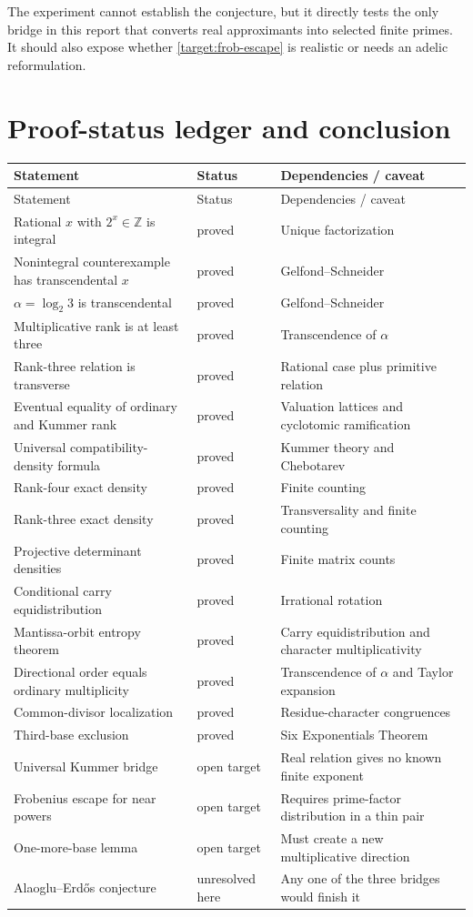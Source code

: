 \documentclass[11pt,oneside]{article}
\theoremstyle{definition}
\theoremstyle{remark}
\newcommand{\Z}{\mathbb{Z}}
\begin{document}
The experiment cannot establish the conjecture, but it directly tests the
only bridge in this report that converts real approximants into selected
finite primes.  It should also expose whether
\cref{target:frob-escape} is realistic or needs an adelic reformulation.

\section{Proof-status ledger and conclusion}\label{sec:status}

\begin{longtable}{@{}p{}p{}p{}@{}}
\toprule
Statement & Status & Dependencies / caveat\\
\midrule
\endfirsthead
\toprule
Statement & Status & Dependencies / caveat\\
\midrule
\endhead
Rational $x$ with $2^x\in\Z$ is integral & proved & Unique factorization\\
Nonintegral counterexample has transcendental $x$ & proved & Gelfond--Schneider\\
$\alpha=\log_2 3$ is transcendental & proved & Gelfond--Schneider\\
Multiplicative rank is at least three & proved & Transcendence of $\alpha$\\
Rank-three relation is transverse & proved & Rational case plus primitive relation\\
Eventual equality of ordinary and Kummer rank & proved & Valuation lattices and cyclotomic ramification\\
Universal compatibility-density formula & proved & Kummer theory and Chebotarev\\
Rank-four exact density & proved & Finite counting\\
Rank-three exact density & proved & Transversality and finite counting\\
Projective determinant densities & proved & Finite matrix counts\\
Conditional carry equidistribution & proved & Irrational rotation\\
Mantissa-orbit entropy theorem & proved & Carry equidistribution and character multiplicativity\\
Directional order equals ordinary multiplicity & proved & Transcendence of $\alpha$ and Taylor expansion\\
Common-divisor localization & proved & Residue-character congruences\\
Third-base exclusion & proved & Six Exponentials Theorem\\
Universal Kummer bridge & open target & Real relation gives no known finite exponent\\
Frobenius escape for near powers & open target & Requires prime-factor distribution in a thin pair\\
One-more-base lemma & open target & Must create a new multiplicative direction\\
Alaoglu--Erd\H{o}s conjecture & unresolved here & Any one of the three bridges would finish it\\
\bottomrule
\end{longtable}
\end{document}
